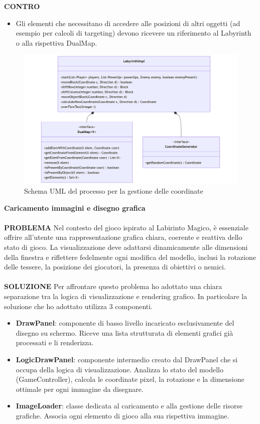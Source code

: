 \documentclass[a4paper,12pt]{report}
\begin{document}
\textbf{CONTRO}
\begin{itemize}
	\item Gli elementi che necessitano di accedere alle posizioni di altri oggetti (ad esempio per calcoli di targeting) devono ricevere un 
	riferimento al Labyrinth o alla rispettiva DualMap.
\end{itemize}
\begin{figure}[H]
	\centering{}
	\includegraphics[width=14cm]{img/GestioneCoordinate.png}
	\caption{Schema UML del processo per la gestione delle coordinate}
	\label{img:Gestione Coordinate}
\end{figure}
\textbf{Caricamento immagini e disegno grafica}
\\
\\
\textbf{PROBLEMA}
Nel contesto del gioco ispirato al Labirinto Magico, è essenziale offrire all’utente una rappresentazione grafica chiara, coerente e reattiva dello stato di gioco. 
La visualizzazione deve adattarsi dinamicamente alle dimensioni della finestra e 
riflettere fedelmente ogni modifica del modello, inclusi la rotazione delle tessere, la posizione dei giocatori, la presenza di obiettivi o nemici.
\\
\\
\textbf{SOLUZIONE}
Per affrontare questo problema ho adottato una chiara separazione tra la logica di visualizzazione e rendering grafico.
In particolare la soluzione che ho adottato utilizza 3 componenti.
\begin{itemize}
	\item \textbf{DrawPanel}: componente di basso livello incaricato esclusivamente del disegno su schermo. Riceve una lista strutturata di elementi grafici già processati e li renderizza.
	\item \textbf{LogicDrawPanel}: componente intermedio creato dal DrawPanel che si occupa della logica di visualizzazione. 
	Analizza lo stato del modello (GameController), calcola le coordinate pixel, la rotazione e la dimensione ottimale per ogni immagine da disegnare.
	\item \textbf{ImageLoader}:  classe dedicata al caricamento e alla gestione delle risorse grafiche. Associa ogni elemento di gioco alla sua rispettiva immagine.
\end{itemize}
\end{document}
